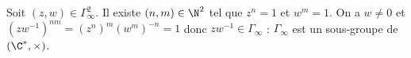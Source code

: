 Soit $(z,w)\in\Gamma^2_\infty$. Il existe $(n,m)\in\N^2$ tel que $z^n = 1$ et 
$w^m = 1$. On a $w \neq 0$ et $(zw^{-1})^{nm} = (z^n)^m (w^m)^{-n} = 1$ donc
$zw^{-1}\in\Gamma_\infty$ : $\Gamma_\infty$ est un sous-groupe de
$(\C^{\ast},\times)$. 

